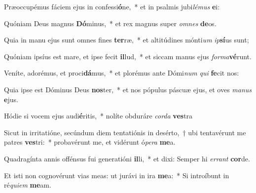 \item Præoccupémus fáciem ejus in confessi\textbf{ó}ne,~* et in psalmis jubi\textit{lé}\textit{mus} \textbf{e}i:
\item Quóniam Deus magnus \textbf{Dó}minus,~* et rex magnus super \textit{om}\textit{nes} \textbf{de}os.
\item Quia in manu ejus sunt omnes fines \textbf{ter}ræ,~* et altitúdines mónti\textit{um} \textit{ip}\textbf{sí}us sunt;
\item Quóniam ipsíus est mare, et ipse fecit \textbf{il}lud,~* et siccam manus ejus \textit{for}\textit{ma}\textbf{vé}runt.
\item Veníte, adorémus, et proci\textbf{dá}mus,~* et plorémus ante Dómi\textit{num} \textit{qui} \textbf{fe}cit nos:
\item Quia ipse est Dóminus Deus \textbf{nos}ter,~* et nos pópulus páscuæ ejus, et oves \textit{ma}\textit{nus} \textbf{e}jus.
\item Hódie si vocem ejus audi\textbf{é}ritis,~* nolíte obduráre \textit{cor}\textit{da} \textbf{ves}tra
\item Sicut in irritatióne, secúndum diem tentatiónis in desérto,~† ubi tentavérunt me patres \textbf{ves}tri:~* probavérunt me, et vidérunt ó\textit{pe}\textit{ra} \textbf{me}a.
\item Quadragínta annis offénsus fui generatióni \textbf{il}li,~* et dixi: Semper hi \textit{er}\textit{rant} \textbf{cor}de.
\item Et isti non cognovérunt vias meas: ut jurávi in ira \textbf{me}a:~* Si introíbunt in ré\textit{qui}\textit{em} \textbf{me}am.
